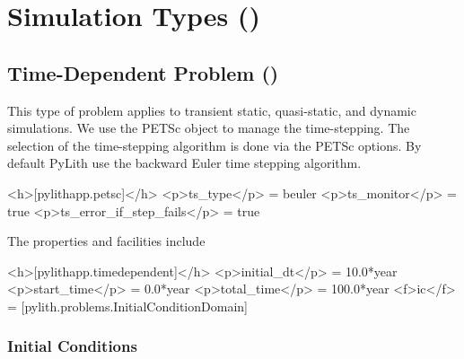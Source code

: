 \section{Simulation Types (\protect{})}

\subsection{Time-Dependent Problem (\protect{})}

This type of problem applies to transient static, quasi-static, and
dynamic simulations. We use the PETSc  object to manage the
time-stepping. The selection of the time-stepping algorithm is done
via the PETSc options. By default PyLith use the backward Euler time
stepping algorithm.

\begin{cfg}
<h>[pylithapp.petsc]</h>
<p>ts_type</p> = beuler
<p>ts_monitor</p> = true
<p>ts_error_if_step_fails</p> = true
\end{cfg}

The  properties and facilities include
\begin{inventory}
\end{inventory}

\begin{cfg}
<h>[pylithapp.timedependent]</h>
<p>initial_dt</p> = 10.0*year
<p>start_time</p> = 0.0*year
<p>total_time</p> = 100.0*year
<f>ic</f> = [pylith.problems.InitialConditionDomain]
\end{cfg}


\subsubsection{Initial Conditions}

